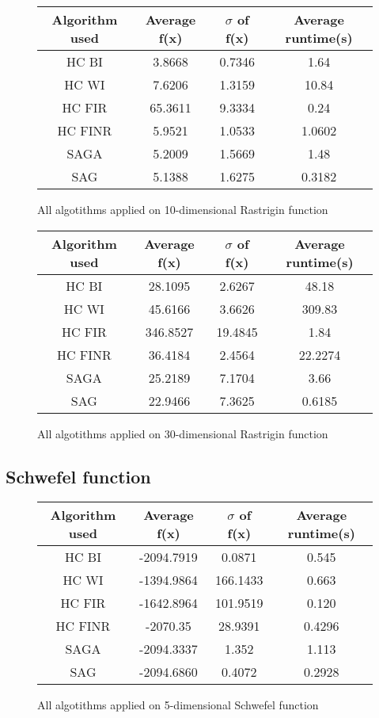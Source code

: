 \documentclass{article}
\begin{document}
\begin{figure}[H]
	\begin{tabular}{|c||c|c|c|} \hline
		Algorithm used & Average f(x) & $\sigma$ of f(x) & Average runtime(s) \\ \hline \hline
		HC BI & 3.8668 & 0.7346 & 1.64 \\ \hline
		HC WI & 7.6206 & 1.3159 & 10.84 \\ \hline
		HC FIR & 65.3611 & 9.3334 & 0.24 \\ \hline
		HC FINR & 5.9521 & 1.0533 & 1.0602 \\ \hline
		SAGA & 5.2009 & 1.5669 & 1.48 \\ \hline
		SAG & 5.1388 & 1.6275 & 0.3182 \\ \hline
\end{tabular}
\caption{All algotithms applied on 10-dimensional Rastrigin function}
\end{figure}

\begin{figure}[H]
	\begin{tabular}{|c||c|c|c|} \hline
		Algorithm used & Average f(x) & $\sigma$ of f(x) & Average runtime(s) \\ \hline \hline
		HC BI & 28.1095 & 2.6267 & 48.18 \\ \hline
		HC WI & 45.6166 & 3.6626 & 309.83 \\ \hline
		HC FIR & 346.8527 & 19.4845 & 1.84 \\ \hline
		HC FINR & 36.4184 & 2.4564 & 22.2274 \\ \hline
		SAGA & 25.2189 & 7.1704 & 3.66 \\ \hline
		SAG & 22.9466 & 7.3625 & 0.6185 \\ \hline
\end{tabular}
\caption{All algotithms applied on 30-dimensional Rastrigin function}
\end{figure}

\subsection{Schwefel function}

\begin{figure}[H]
	\begin{tabular}{|c||c|c|c|} \hline
		Algorithm used & Average f(x) & $\sigma$ of f(x) & Average runtime(s) \\ \hline \hline
		HC BI & -2094.7919 & 0.0871 & 0.545 \\ \hline
		HC WI & -1394.9864 & 166.1433 & 0.663 \\ \hline
		HC FIR & -1642.8964 & 101.9519 & 0.120 \\ \hline
		HC FINR & -2070.35 & 28.9391 & 0.4296 \\ \hline
		SAGA & -2094.3337 & 1.352 & 1.113 \\ \hline
		SAG & -2094.6860 & 0.4072 & 0.2928 \\ \hline
\end{tabular}
\caption{All algotithms applied on 5-dimensional Schwefel function}
\end{figure}
\end{document}
